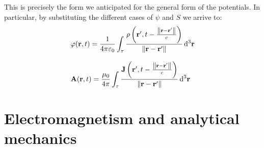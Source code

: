 This is precisely the form we anticipated for the general form of the potentials. In particular, by substituting the different cases of $\psi$ and $S$ we arrive to:
\begin{equation}
  \begin{split}
    &\varphi(\vb{r},t) = \dfrac{1}{4 \pi \varepsilon_0}\int_{\tau} \dfrac{\rho \left(\vb{r}', t-\frac{\norm{\vb{r}-\vb{r}'}}{c}\right)}{\norm{\vb{r}-\vb{r}'}}\dd{^3 \vb{r}} \\[8pt]
    &\vb{A}(\vb{r},t) = \dfrac{\mu_0}{4 \pi }\int_{\tau} \dfrac{\vb{J} \left(\vb{r}', t-\frac{\norm{\vb{r}-\vb{r}'}}{c}\right)}{\norm{\vb{r}-\vb{r}'}}\dd{^3 \vb{r}}
  \end{split}
\end{equation}
\chapter{Electromagnetism and analytical mechanics}
